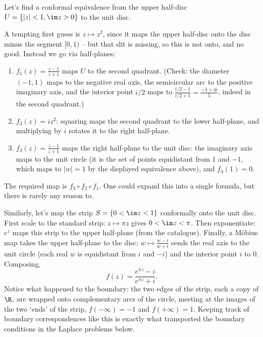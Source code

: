 \begin{example}
	Let's find a conformal equivalence from the upper half-disc $U = \{|z| < 1, \im z > 0\}$ to the unit disc.

	A tempting first guess is $z \mapsto z^2$, since it maps the upper half-disc onto the disc minus the segment $[0, 1)$ -- but that slit is missing, so this is not onto, and no good. Instead we go via half-planes:
	\begin{enumerate}
		\item $f_1(z) = \frac{z - 1}{z + 1}$ maps $U$ to the second quadrant. (Check: the diameter $(-1, 1)$ maps to the negative real axis, the semicircular arc to the positive imaginary axis, and the interior point $i/2$ maps to $\frac{i/2 - 1}{i/2 + 1} = \frac{-3 + 4i}{5}$, indeed in the second quadrant.)
		\item $f_2(z) = iz^2$: squaring maps the second quadrant to the lower half-plane, and multiplying by $i$ rotates it to the right half-plane.
		\item $f_3(z) = \frac{z-1}{z+1}$ maps the right half-plane to the unit disc: the imaginary axis maps to the unit circle (it is the set of points equidistant from $1$ and $-1$, which maps to $|w| = 1$ by the displayed equivalence above), and $f_3(1) = 0$.
	\end{enumerate}
	The required map is $f_3 \circ f_2 \circ f_1$. One could expand this into a single formula, but there is rarely any reason to.
\end{example}

\begin{example}
	Similarly, let's map the strip $S = \{0 < \im z < 1\}$ conformally onto the unit disc. First scale to the standard strip: $z \mapsto \pi z$ gives $0 < \im z < \pi$. Then exponentiate: $e^z$ maps this strip to the upper half-plane (from the catalogue). Finally, a M\"obius map takes the upper half-plane to the disc: $w \mapsto \frac{w - i}{w + i}$ sends the real axis to the unit circle (each real $w$ is equidistant from $i$ and $-i$) and the interior point $i$ to $0$. Composing,
	$$
	f(z) = \frac{e^{\pi z} - i}{e^{\pi z} + i}.
	$$
	Notice what happened to the boundary: the two edges of the strip, each a copy of $\R$, are wrapped onto complementary arcs of the circle, meeting at the images of the two `ends' of the strip, $f(-\infty) = -1$ and $f(+\infty) = 1$. Keeping track of boundary correspondences like this is exactly what transported the boundary conditions in the Laplace problems below.
\end{example}

